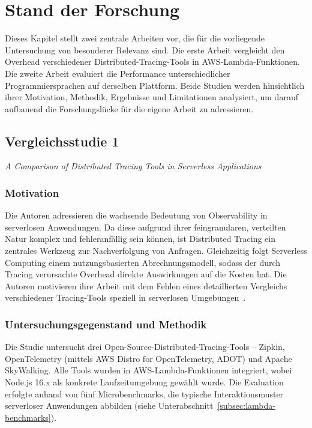 \chapter{Stand der Forschung}
\label{ch:chapter03}
Dieses Kapitel stellt zwei zentrale Arbeiten vor, die für die vorliegende Untersuchung 
von besonderer Relevanz sind. Die erste Arbeit vergleicht den Overhead verschiedener Distributed-Tracing-Tools 
in AWS-Lambda-Funktionen. 
Die zweite Arbeit evaluiert die Performance unterschiedlicher Programmiersprachen auf derselben Plattform. 
Beide Studien werden hinsichtlich ihrer Motivation, Methodik, Ergebnisse und Limitationen analysiert, 
um darauf aufbauend die Forschungslücke für die eigene Arbeit zu adressieren.

\section{Vergleichsstudie 1}
\label{sec:a-comparison}
\emph{\glqq A Comparison of Distributed Tracing Tools in Serverless Applications\grqq }
\subsection{Motivation}
\label{subsec:eder-motivation}

Die Autoren adressieren die wachsende Bedeutung von Observability in serverlosen Anwendungen. 
Da diese aufgrund ihrer feingranularen, verteilten Natur komplex und fehleranfällig sein können, 
ist Distributed Tracing ein zentrales Werkzeug zur Nachverfolgung von Anfragen. 
Gleichzeitig folgt Serverless Computing einem nutzungsbasierten Abrechnungsmodell, 
sodass der durch Tracing verursachte Overhead direkte Auswirkungen auf die Kosten hat. 
Die Autoren motivieren ihre Arbeit mit dem Fehlen eines detaillierten Vergleichs verschiedener Tracing-Tools 
speziell in serverlosen Umgebungen~\cite{10254754}.

\subsection{Untersuchungsgegenstand und Methodik}
\label{subsec:eder-methodology}

Die Studie untersucht drei Open-Source-Distributed-Tracing-Tools – Zipkin, OpenTelemetry (mittels AWS Distro for OpenTelemetry, ADOT) 
und Apache SkyWalking. Alle Tools wurden in AWS-Lambda-Funktionen integriert, wobei Node.js 16.x als konkrete Laufzeitumgebung 
gewählt wurde. Die Evaluation erfolgte anhand von fünf Microbenchmarks, die typische Interaktionsmuster serverloser Anwendungen abbilden 
(siehe Unterabschnitt~\ref{subsec:lambda-benchmarks}).

